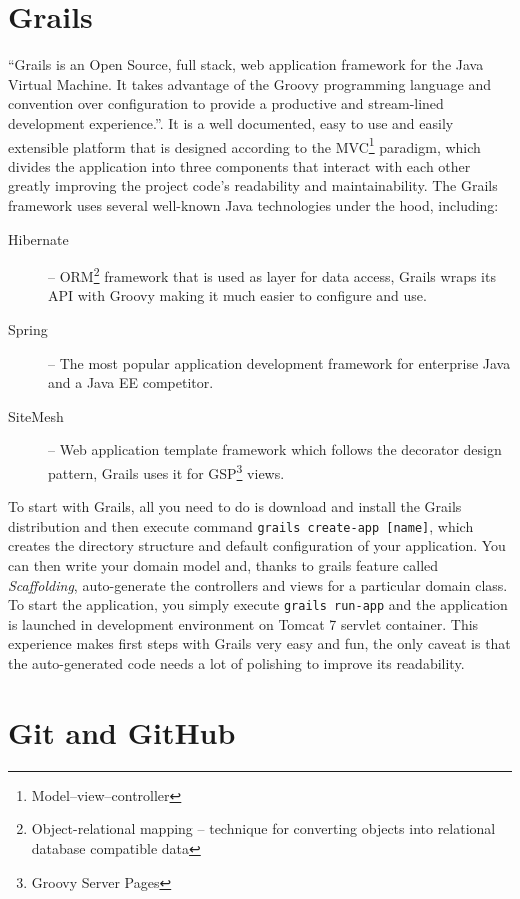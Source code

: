 \section{Grails}

``Grails is an Open Source, full stack, web application framework for the Java Virtual Machine. It takes advantage of the Groovy programming language and convention over configuration to provide a productive and stream-lined development experience.''\cite{grails-homepage}. It is a well documented, easy to use and easily extensible platform that is designed according to the MVC\footnote{Model--view--controller} paradigm, which divides the application into three components that interact with each other greatly improving the project code's readability and maintainability. The Grails framework uses several well-known Java technologies under the hood, including:

\begin{description}
    \item[Hibernate] -- ORM\footnote{Object-relational mapping -- technique for converting objects into relational database compatible data} framework that is used as layer for data access, Grails wraps its API with Groovy making it much easier to configure and use.
    \item[Spring] -- The most popular application development framework for enterprise Java\cite{springsource-homepage} and a Java EE competitor.
    \item[SiteMesh] -- Web application template framework which follows the decorator design pattern, Grails uses it for GSP\footnote{Groovy Server Pages} views.
\end{description}

To start with Grails, all you need to do is download and install the Grails distribution and then execute command \texttt{grails create-app [name]}, which creates the directory structure and default configuration of your application. You can then write your domain model and, thanks to grails feature called \emph{Scaffolding}, auto-generate the controllers and views for a particular domain class. To start the application, you simply execute \texttt{grails run-app} and the application is launched in development environment on Tomcat 7 servlet container. This experience makes first steps with Grails very easy and fun, the only caveat is that the auto-generated code needs a lot of polishing to improve its readability.

\section{Git and GitHub}


